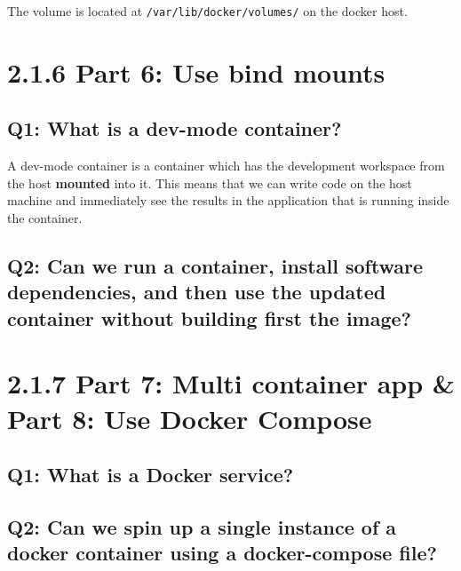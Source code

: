 \documentclass[
]{article}
\begin{document}
The volume is located at \texttt{/var/lib/docker/volumes/} on the docker
host.

\hypertarget{part-6-use-bind-mounts}{%
\section{2.1.6 Part 6: Use bind mounts}\label{part-6-use-bind-mounts}}

\hypertarget{q1-what-is-a-dev-mode-container}{%
\subsection{Q1: What is a dev-mode
container?}\label{q1-what-is-a-dev-mode-container}}

A dev-mode container is a container which has the development workspace
from the host \textbf{mounted} into it. This means that we can write
code on the host machine and immediately see the results in the
application that is running inside the container.

\hypertarget{q2-can-we-run-a-container-install-software-dependencies-and-then-use-the-updated-container-without-building-first-the-image}{%
\subsection{Q2: Can we run a container, install software dependencies,
and then use the updated container without building first the
image?}\label{q2-can-we-run-a-container-install-software-dependencies-and-then-use-the-updated-container-without-building-first-the-image}}

\hypertarget{part-7-multi-container-app-part-8-use-docker-compose}{%
\section{2.1.7 Part 7: Multi container app \& Part 8: Use Docker
Compose}\label{part-7-multi-container-app-part-8-use-docker-compose}}

\hypertarget{q1-what-is-a-docker-service}{%
\subsection{Q1: What is a Docker
service?}\label{q1-what-is-a-docker-service}}

\hypertarget{q2-can-we-spin-up-a-single-instance-of-a-docker-container-using-a-docker-compose-file}{%
\subsection{Q2: Can we spin up a single instance of a docker container
using a docker-compose
file?}\label{q2-can-we-spin-up-a-single-instance-of-a-docker-container-using-a-docker-compose-file}}
\end{document}
